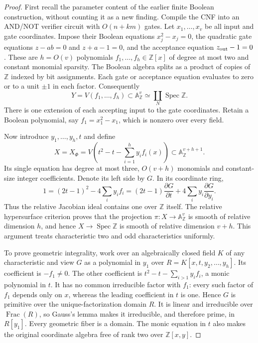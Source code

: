 \begin{proof}
First recall the parameter content of the earlier finite Boolean construction, without counting it as a new finding. Compile the CNF into an AND/NOT verifier circuit with $O(n+km)$ gates. Let $x_1,\ldots,x_v$ be all input and gate coordinates. Impose their Boolean equations $x_j^2-x_j=0$, the quadratic gate equations $z-ab=0$ and $z+a-1=0$, and the acceptance equation $z_{\rm out}-1=0$. These are $h=O(v)$ polynomials $f_1,\ldots,f_h\in\mathbb Z[x]$ of degree at most two and constant monomial sparsity. The Boolean algebra splits as a product of copies of $\mathbb Z$ indexed by bit assignments. Each gate or acceptance equation evaluates to zero or to a unit $\pm1$ in each factor. Consequently
\[
        Y=V(f_1,\ldots,f_h)\subset\mathbb A^v_\mathbb Z
           \simeq\coprod_{N}\operatorname{Spec}\mathbb Z.
\]
There is one extension of each accepting input to the gate coordinates. Retain a Boolean polynomial, say $f_1=x_1^2-x_1$, which is nonzero over every field.

Now introduce $y_1,\ldots,y_h,t$ and define
\[
 X=X_\Phi=V\left(t^2-t-\sum_{i=1}^{h}y_i f_i(x)\right)
                  \subset\mathbb A^{v+h+1}_\mathbb Z.
\]
Its single equation has degree at most three, $O(v+h)$ monomials and constant-size integer coefficients. Denote its left side by $G$. In its coordinate ring,
\[
 1=(2t-1)^2-4\sum_i y_i f_i
   =(2t-1)\frac{\partial G}{\partial t}
       +4\sum_i y_i\frac{\partial G}{\partial y_i}.
\]
Thus the relative Jacobian ideal contains one over $\mathbb Z$ itself. The relative hypersurface criterion proves that the projection $\pi:X\to\mathbb A^v_\mathbb Z$ is smooth of relative dimension $h$, and hence $X\to\operatorname{Spec}\mathbb Z$ is smooth of relative dimension $v+h$. This argument treats characteristic two and odd characteristics uniformly.

To prove geometric integrality, work over an algebraically closed field $K$ of any characteristic and view $G$ as a polynomial in $y_1$ over
$R=K[x,t,y_2,\ldots,y_h]$. Its coefficient is $-f_1\ne0$. The other coefficient is $t^2-t-\sum_{i>1}y_i f_i$, a monic polynomial in $t$. It has no common irreducible factor with $f_1$: every such factor of $f_1$ depends only on $x$, whereas the leading coefficient in $t$ is one. Hence $G$ is primitive over the unique-factorization domain $R$. It is linear and irreducible over $\operatorname{Frac}(R)$, so Gauss's lemma makes it irreducible, and therefore prime, in $R[y_1]$. Every geometric fiber is a domain. The monic equation in $t$ also makes the original coordinate algebra free of rank two over $\mathbb Z[x,y]$.


\end{proof}
